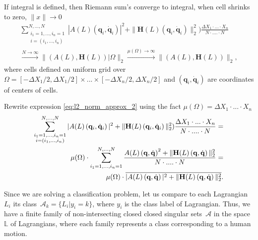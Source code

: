 \documentclass[sn-mathphys-num]{sn-jnl}
\theoremstyle{thmstylethree}
\theoremstyle{thmstyletwo}
\theoremstyle{thmstyleone}
\begin{document}
If integral \label{eq:l2_norm_approx_1} is defined, then Riemann sum's converge to integral, when cell shrinks to zero, $\|x\| \to 0$
\begin{equation}
\label{eq:l2_norm_approx_2}
\begin{split}
\sum_{\substack{i_1 = 1, ..., i_n = 1\\ i = (i_1, ..., i_n)}}^{N, ..., N} |A(L)\left(\mathbf{q}_i, \dot{\mathbf{q}}_i\right)|^2  + \|\mathbf{H}(L)\left(\mathbf{q}_i, \dot{\mathbf{q}}_i\right)\|_2^2) \frac{\Delta X_1 \cdot ... \cdot X_n}{N \cdot .... \cdot N}
\\
\overset{N \to \infty}{\longrightarrow}\|(A(L), \mathbf{H}(L))| \Omega\|_2
\overset{\mu(\Omega) \to \infty}{\longrightarrow} \|(A(L), \mathbf{H}(L))\|_2,
\end{split}
\end{equation}
where cells defined on uniform grid over $\Omega = [-\Delta X_1/2,\Delta X_1/2]  \times ... \times  [-\Delta X_n/2,\Delta X_n/2]$ and $\left(\mathbf{q}_i, \dot{\mathbf{q}}_i\right)$ are coordinates of centers of cells.

Rewrite expression \ref{eq:l2_norm_approx_2} using the fact $\mu(\Omega) = \Delta X_1 \cdot ... \cdot X_n$
\begin{equation}
\label{eq:l2_norm_approx_main}
\centering
\begin{split}
\sum_{\substack{i_1 = 1, ..., i_n = 1\\ i = (i_1, ..., i_n)}}^{N, ..., N} |A(L)\left(\mathbf{q}_i, \dot{\mathbf{q}}_i\right)|^2  + \|\mathbf{H}(L)\left(\mathbf{q}_i, \dot{\mathbf{q}}_i\right)\|_2^2) \frac{\Delta X_1 \cdot ... \cdot X_n}{N \cdot .... \cdot N} =
\\
\mu(\Omega) \cdot \sum_{i_1 = 1, ..., i_n = 1}^{N, ..., N} \frac{A(L)\left(\mathbf{q}, \dot{\mathbf{q}}\right)^2 + \|\mathbf{H}(L)\left(\mathbf{q}, \dot{\mathbf{q}}\right)\|_2^2}{N \cdot .... \cdot N} =  
\\ 
\mu(\Omega) \cdot \overline{|A(L)\left(\mathbf{q}, \dot{\mathbf{q}}\right)|^2 + \|\mathbf{H}(L)\left(\mathbf{q}, \dot{\mathbf{q}}\right)\|_2^2}.
\end{split}   
\end{equation}

Since we are solving a classification problem, let us compare to each Lagrangian~$L_i$ its class~$\mathcal{A}_{k} = \{L_i| y_i = k\}$, where $y_i$ is the class label of Lagrangian. Thus, we have a finite family of non-intersecting closed closed singular sets~$\mathcal{A}$ in the space~$\mathbb{L}$ of Lagrangians, where each family represents a class corresponding to a human motion.
\end{document}
